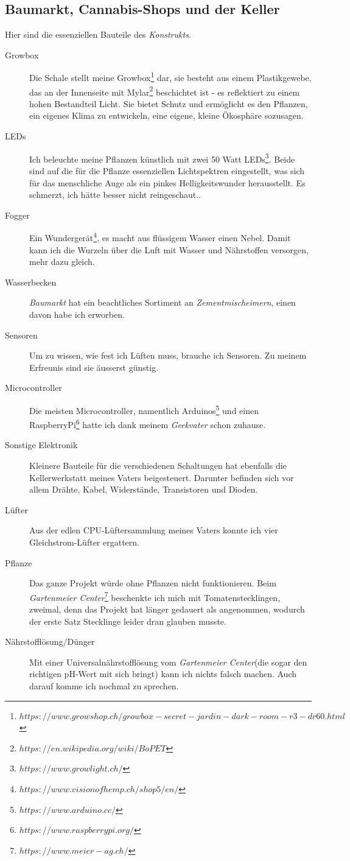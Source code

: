 \documentclass[12pt,titlepage,a4paper]{article}
\begin{document}
\subsection{Baumarkt, Cannabis-Shops und der Keller}
Hier sind die essenziellen Bauteile des \textit{Konstrukts}.
\begin{description}
\item[Growbox] Die Schale stellt meine Growbox\footnote{$https://www.growshop.ch/growbox-secret-jardin-dark-room-r3-dr60.html$} dar, sie besteht aus einem Plastikgewebe, das an der Innenseite mit Mylar\footnote{$https://en.wikipedia.org/wiki/BoPET$} beschichtet ist - es reflektiert zu einem hohen Bestandteil Licht. Sie bietet Schutz und ermöglicht es den Pflanzen, ein eigenes Klima zu entwickeln, eine eigene, kleine Ökosphäre sozusagen.
\item[LEDs] Ich beleuchte meine Pflanzen künstlich mit zwei 50 Watt LEDs\footnote{$https://www.growlight.ch/$}. Beide sind auf die für die Pflanze essenziellen Lichtspektren eingestellt, was sich für das menschliche Auge als ein pinkes Helligkeitswunder herausstellt. Es schmerzt, ich hätte besser nicht reingeschaut..
\item[Fogger] Ein Wundergerät\footnote{$https://www.visionofhemp.ch/shop5/en/$}, es macht aus flüssigem Wasser einen Nebel. Damit kann ich die Wurzeln über die Luft mit Wasser und Nährstoffen versorgen, mehr dazu gleich.
\item[Wasserbecken] \textit{Baumarkt} hat ein beachtliches Sortiment an \textit{Zementmischeimern}, einen davon habe ich erworben.
\item[Sensoren] Um zu wissen, wie fest ich Lüften muss, brauche ich Sensoren. Zu meinem Erfreunis sind sie äusserst günstig.
\item[Microcontroller] Die meisten Microcontroller, namentlich Arduinos\footnote{$https://www.arduino.cc/$} und einen RaspberryPi\footnote{$https://www.raspberrypi.org/$} hatte ich dank meinem \textit{Geekvater} schon zuhause.
\item[Sonstige Elektronik] Kleinere Bauteile für die verschiedenen Schaltungen hat ebenfalls die Kellerwerkstatt meines Vaters beigesteuert. Darunter befinden sich vor allem Drähte, Kabel, Widerstände, Transistoren und Dioden.
\item[Lüfter] Aus der edlen CPU-Lüftersammlung meines Vaters konnte ich vier Gleichstrom-Lüfter ergattern.
\item[Pflanze] Das ganze Projekt würde ohne Pflanzen nicht funktionieren. Beim \textit{Gartenmeier Center}\footnote{$https://www.meier-ag.ch/$} beschenkte ich mich mit Tomatenstecklingen, zweimal, denn das Projekt hat länger gedauert als angenommen, wodurch der erste Satz Stecklinge leider dran glauben musste.
\item[Nährstofflösung/Dünger] Mit einer Universalnährstofflösung vom \textit{Gartenmeier Center}(die sogar den richtigen pH-Wert mit sich bringt) kann ich nichts falsch machen. Auch darauf komme ich nochmal zu sprechen.
\end{description}
\end{document}
